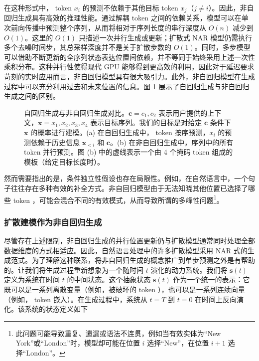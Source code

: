 \documentclass[UTF8,a4paper,zihao=-4,oneside,openany]{ctexbook}
\makeatletter
\newcommand{\AMLFigure}[2][0.96\linewidth]{%
  \begingroup
  \let\AtBeginDocument\@gobble
  \endgroup
}
\makeatother
\begin{document}
在这种形式中， token $x_i$ 的预测不依赖于其他目标 token $x_{j}$（$j \neq i$）。因此，非自回归生成具有高效的推理性能。通过解耦 token 之间的依赖关系，模型可以在单次前向传播中预测整个序列，从而将相对于序列长度的串行深度从 $O(n)$ 减少到 $O(1)$。这里的 $O(1)$ 只描述一次并行生成或更新；扩散式 NAR 模型仍需执行多个去噪时间步，其总采样深度并不是关于扩散步数的 $O(1)$。同时，多步模型可以借助不断更新的全序列状态表达位置间依赖，并不等同于始终采用上述一次性乘积分布。这种并行性使得现代 GPU 能够得到更高效的利用，因此对于延迟要求苛刻的实时应用而言，非自回归模型具有很大吸引力。此外，非自回归模型在生成过程中可以充分利用过去和未来位置的信息。图 \ref{fig:ar-vs-nar-generation} 展示了自回归生成与非自回归生成之间的区别。

\begin{figure}[!t]
\centering
\AMLFigure{figure-ar-vs-nar-generation}
\caption{自回归生成与非自回归生成对比。$\mathbf{c} = {c_1,c_2}$ 表示用户提供的上下文，$\mathbf{x}={x_1,x_2,x_3,x_4}$ 表示目标序列。我们的目标是对给定 $\mathbf{c}$ 条件下 $\mathbf{x}$ 的概率进行建模。(a) 在自回归生成中， token 按序预测，$x_i$ 的预测依赖于历史信息 $\mathbf{x}_{<i}$ 和 $\mathbf{c}$。(b) 在非自回归生成中，序列中的所有 token 并行预测。图 (b) 中的虚线表示一个由 4 个掩码 token 组成的模板（给定目标长度时）。}
\label{fig:ar-vs-nar-generation}
\end{figure}

然而需要指出的是，条件独立性假设也存在局限性。例如，在自然语言中，一个句子往往存在多种有效的补全方式。非自回归模型由于无法知晓其他位置已选择了哪些 token ，可能会混合不同的有效模式，从而导致所谓的多峰性问题\footnote{此问题可能导致重复、遗漏或语法不连贯，例如当有效实体为“New York”或“London”时，模型却可能在位置 $i$ 选择“New”，在位置 $i+1$ 选择“London”。}。

\subsubsection{扩散建模作为非自回归生成}

尽管存在上述限制，非自回归生成的并行位置更新仍与扩散模型通常同时处理全部数据维度的方式相适应。因此，自然语言处理中的许多扩散模型采用 NAR 式的生成范式。为了理解这种联系，将非自回归生成的概念推广到单步预测之外是有帮助的。让我们将生成过程重新想象为一个随时间 $t$ 演化的动力系统。我们将 $\mathbf{s}(t)$ 定义为系统在时间 $t$ 的中间状态。这个抽象状态 $\mathbf{s}(t)$ 作为一个统一的表示：它既可以是一系列离散变量（例如，被破坏的 token ），也可以是一系列连续向量（例如， token 嵌入）。在生成过程中，系统从 $t=T$ 到 $t=0$ 在时间上反向演化。该系统的状态定义如下
\end{document}
